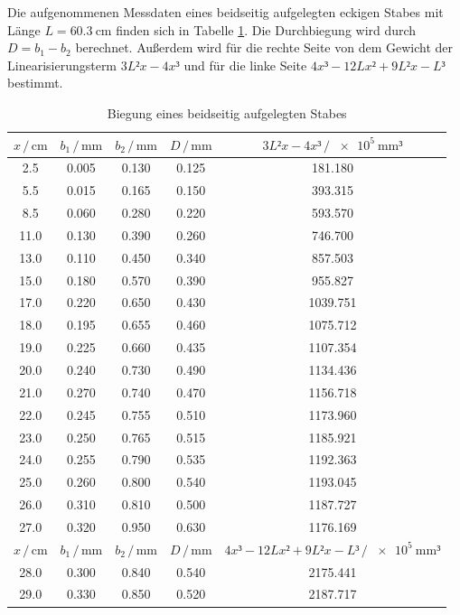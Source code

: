 Die aufgenommenen Messdaten eines beidseitig aufgelegten eckigen Stabes 
mit Länge $L = \SI{60.3}{\centi\meter}$ finden sich in Tabelle \ref{tab:Messdaten3}. 
Die Durchbiegung wird durch $D = b_1 - b_2$ berechnet. Außerdem wird für die
rechte Seite von dem Gewicht der Linearisierungsterm $3L²x-4x³$ und für die
linke Seite $4x³-12Lx² + 9L²x-L³$ bestimmt. 

\begin{table}
\centering
\caption{Biegung eines beidseitig aufgelegten Stabes}
\label{tab:Messdaten3}
\begin{tabular}{c c c c c}
\toprule
$x \,/\, \si{\centi\meter}$ & $b_1 \,/\, \si{\milli\meter}$ & 
$b_2 \,/\, \si{\milli\meter}$ & $D \,/\, \si{\milli\meter}$ &
$3L²x-4x³ \,/\, \SI{e5}{\milli\meter³}$\\
\midrule
 2.5 & 0.005 & 0.130 & 0.125 &  181.180\\
 5.5 & 0.015 & 0.165 & 0.150 &  393.315\\
 8.5 & 0.060 & 0.280 & 0.220 &  593.570\\
11.0 & 0.130 & 0.390 & 0.260 &  746.700\\
13.0 & 0.110 & 0.450 & 0.340 &  857.503\\
15.0 & 0.180 & 0.570 & 0.390 &  955.827\\
17.0 & 0.220 & 0.650 & 0.430 & 1039.751\\
18.0 & 0.195 & 0.655 & 0.460 & 1075.712\\
19.0 & 0.225 & 0.660 & 0.435 & 1107.354\\
20.0 & 0.240 & 0.730 & 0.490 & 1134.436\\
21.0 & 0.270 & 0.740 & 0.470 & 1156.718\\
22.0 & 0.245 & 0.755 & 0.510 & 1173.960\\
23.0 & 0.250 & 0.765 & 0.515 & 1185.921\\
24.0 & 0.255 & 0.790 & 0.535 & 1192.363\\
25.0 & 0.260 & 0.800 & 0.540 & 1193.045\\
26.0 & 0.310 & 0.810 & 0.500 & 1187.727\\
27.0 & 0.320 & 0.950 & 0.630 & 1176.169\\
\midrule
$x \,/\, \si{\centi\meter}$ & $b_1 \,/\, \si{\milli\meter}$ & 
$b_2 \,/\, \si{\milli\meter}$ & $D \,/\, \si{\milli\meter}$ &
$4x³-12Lx²+9L²x-L³ \,/\, \SI{e5}{\milli\meter³}$\\
\midrule
28.0 & 0.300 & 0.840 & 0.540 & 2175.441\\
29.0 & 0.330 & 0.850 & 0.520 & 2187.717\\

\end{tabular}
\end{table}
